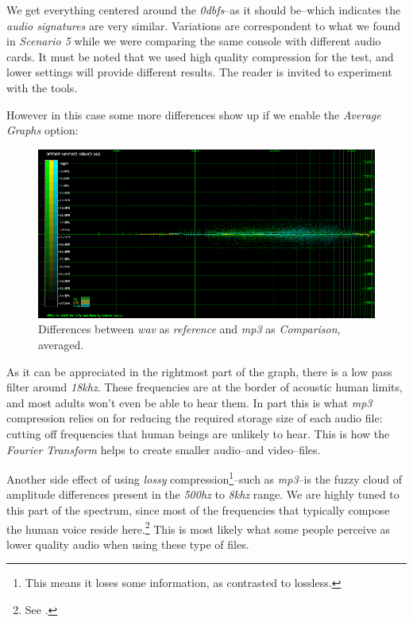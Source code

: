 \documentclass[10pt,a4paper]{report}
\newcommand{\ac}[1]{\textit{\mbox{\acrshort{#1}}}}
\newcommand{\hz}[1]{\textit{\mbox{#1\acrshort{hz}}}}
\newcommand{\khz}[1]{\textit{\mbox{#1\acrshort{khz}}}}
\newcommand{\db}[1]{\textit{\mbox{#1\acrshort{dbfs}}}}
\begin{document}
We get everything centered around the \db{0}--as it should be--which indicates the \textit{audio signatures} are very similar. Variations are correspondent to what we found in \textit{Scenario 5} while we were comparing the same console with different audio cards. It must be noted that we used high quality compression for the test, and lower settings will provide different results. The reader is invited to experiment with the tools.

However in this case some more differences show up if we enable the \textit{Average Graphs} option:

\begin{figure}[H]
	\centering
	\includegraphics[width=1.0\linewidth]{images/interpretation/Plot6-mp3-2.png}
	\caption[WAV vs MP3 Averaged]{Differences between \ac{wav} as \textit{reference} and \ac{mp3} as \textit{Comparison}, averaged.}
	\label{fig:plot6-mp3-2}
\end{figure}

As it can be appreciated in the rightmost part of the graph, there is a low pass filter around \khz{18}. These frequencies are at the border of acoustic human limits, and most adults won't even be able to hear them. In part this is what \ac{mp3} compression relies on for reducing the required storage size of each audio file: cutting off frequencies that human beings are unlikely to hear. This is how the \textit{Fourier Transform} helps to create smaller audio--and video--files.

Another side effect of using \textit{lossy} compression\footnote{This means it loses some information, as contrasted to lossless.}--such as \ac{mp3}--is the fuzzy cloud of amplitude differences present in the \hz{500} to \khz{8} range. We are highly tuned to this part of the spectrum, since most of the frequencies that typically compose the human voice reside here.\footnote{See \cite{humanvoice}.} This is most likely what some people perceive as lower quality audio when using these type of files.
\end{document}
